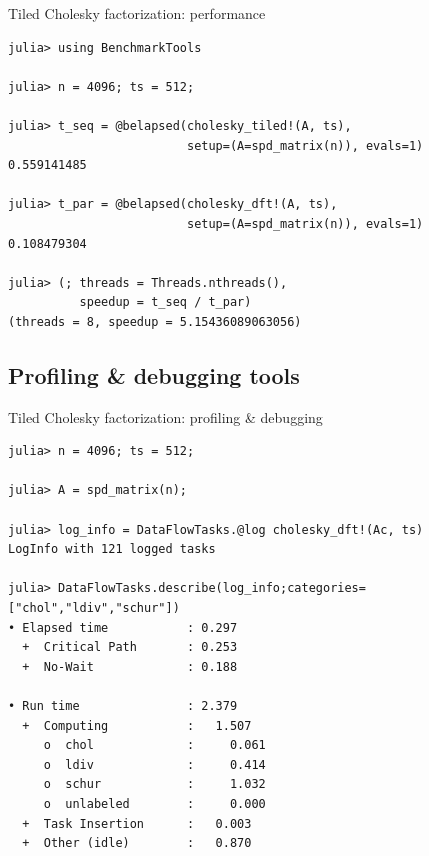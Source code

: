 \documentclass{beamer}
\begin{document}
\begin{frame}[fragile]{Tiled Cholesky factorization: performance}
\begin{verbatim}
julia> using BenchmarkTools

julia> n = 4096; ts = 512;

julia> t_seq = @belapsed(cholesky_tiled!(A, ts),
                         setup=(A=spd_matrix(n)), evals=1)
0.559141485

julia> t_par = @belapsed(cholesky_dft!(A, ts),
                         setup=(A=spd_matrix(n)), evals=1)
0.108479304

julia> (; threads = Threads.nthreads(),
          speedup = t_seq / t_par)
(threads = 8, speedup = 5.15436089063056)
\end{verbatim}
\end{frame}

\subsection{Profiling \& debugging tools}

\begin{frame}[fragile]{Tiled Cholesky factorization: profiling \& debugging}
  \begin{verbatim}
julia> n = 4096; ts = 512;
    
julia> A = spd_matrix(n);
    
julia> log_info = DataFlowTasks.@log cholesky_dft!(Ac, ts)
LogInfo with 121 logged tasks

julia> DataFlowTasks.describe(log_info;categories=["chol","ldiv","schur"])
• Elapsed time           : 0.297
  +  Critical Path       : 0.253
  +  No-Wait             : 0.188

• Run time               : 2.379
  +  Computing           :   1.507
     o  chol             :     0.061
     o  ldiv             :     0.414
     o  schur            :     1.032
     o  unlabeled        :     0.000
  +  Task Insertion      :   0.003
  +  Other (idle)        :   0.870
\end{verbatim}
\end{frame}
\end{document}
